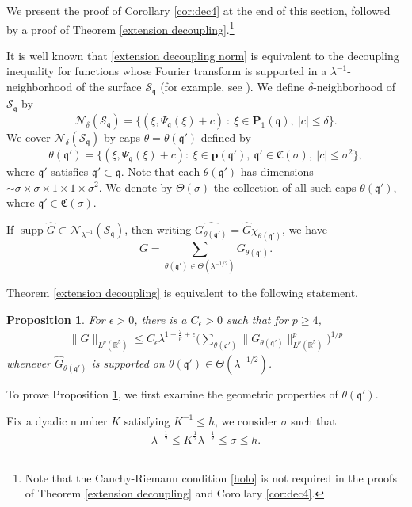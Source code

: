 \documentclass[10pt] %
{amsart}
\theoremstyle{plain}
\newtheorem{prop}[thm]{Proposition}
\numberwithin{equation}{section}
\DeclareMathOperator{\supp}{supp}
\newcommand{\fq}{\mathfrak q}
\newcommand{\fm}{\mathfrak{q'}}
\begin{document}
We present the proof of Corollary \ref{cor:dec4} at the end of this section, followed by a proof of Theorem \ref{extension decoupling}.\footnote{Note that the Cauchy-Riemann condition \eqref{holo} is not required in the proofs of Theorem \ref{extension decoupling} and Corollary \ref{cor:dec4}.}




It is well known that \eqref{extension decoupling norm} is equivalent to the decoupling inequality for functions whose Fourier transform is supported in a $\lambda^{-1}$-neighborhood of the surface 
$\mathcal S_\fq$
(for example, see \cite[Section 5]{BD2}).
We define $\delta$-neighborhood of $\mathcal S_\fq$ by
\[
\mathcal N_{\delta} (\mathcal S_\fq) = \big\{ (\xi,\Psi_{\fq}(\xi)+c) ~ : ~ \xi \in \mathbf P_1(\fq),~ |c|\le \delta \big\}.
\]
We cover $\mathcal N_{\delta} (\mathcal S_\fq)$ by caps $\theta = \theta(\fm)$ defined by 
\[
\theta(\fm) = \big\{ (\xi,\Psi_{\fq}(\xi)+c): ~\xi \in \mathbf p(\fm),~\fm \in \mathfrak C(\sigma),~ |c|\le \sigma^2 \big\},
\]
where $\fm$ satisfies $\fm \subset \fq$.
Note that each $\theta(\fm)$ has dimensions $\sim\sigma\times\sigma\times 1\times1\times\sigma^2$.
We denote by $\Theta (\sigma)$ the collection of all such caps $\theta(\fm)$, where $\fm \in \mathfrak C(\sigma)$.


If $\supp \widehat G \subset \mathcal N_{\lambda^{-1}}(\mathcal S_\fq)$, then writing $\widehat{G_{\theta(\fm)}} = \widehat{G} \chi_{\theta(\fm)}$, we have
\[
G = \sum_{\theta(\fm)\in \Theta(\lambda^{-1/2})} G_{\theta(\fm)} .
\]
 
 
Theorem \ref{extension decoupling} is equivalent to the following statement. 
 

\begin{prop}\label{conic-ext2}
For $\epsilon>0$, there is a $C_\epsilon>0$ such that for $p\ge4$,
\begin{align}\label{prop_cone_result}
\big\|G \big\|_{L^p(\mathbb R^5)} \le C_\epsilon \lambda^{1-\frac2p+\epsilon} \Big( \sum_{\theta(\fm)} \| G_{\theta(\fm)}\|_{L^p(\mathbb R^5)}^p \Big)^{1/p}
\end{align}
whenever $\widehat G_{\theta(\fm)}$ is supported on $\theta(\fm)\in {\Theta}(\lambda^{-1/2})$.
\end{prop}

To prove Proposition \ref{conic-ext2}, we first examine  the geometric properties of   $\theta(\fm)$. 

Fix a dyadic number $K$ satisfying $K^{-1} \le h$, 
we consider $\sigma$ such that
\begin{align}\label{lambda-K-sigma}
 \lambda^{-\frac12}\le K^{ \frac12}\lambda^{-\frac12} \le \sigma  \le h . 
\end{align} 
\end{document}
